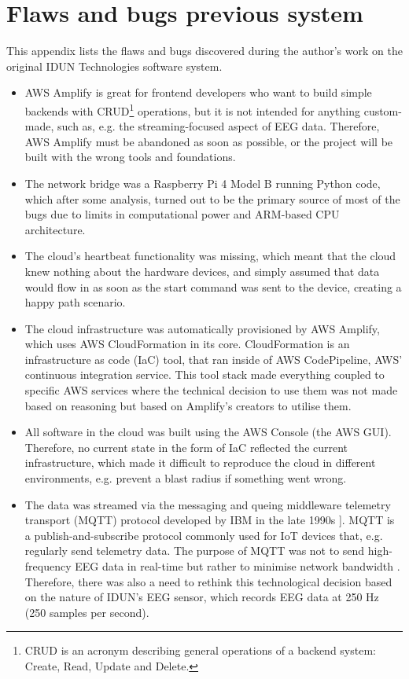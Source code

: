 \chapter{Flaws and bugs previous system}
\label{appendix2-flaws-and-bugs-previous-system}

This appendix lists the flaws and bugs discovered during the author's work on the original IDUN Technologies software system.

\begin{itemize}
  \item AWS Amplify is great for frontend developers who want to build simple backends with CRUD\footnote{CRUD is an acronym describing general operations of a backend system: Create, Read, Update and Delete.} operations, but it is not intended for anything custom-made, such as, e.g. the streaming-focused aspect of EEG data. Therefore, AWS Amplify must be abandoned as soon as possible, or the project will be built with the wrong tools and foundations.
  \item The network bridge was a Raspberry Pi 4 Model B running Python code, which after some analysis, turned out to be the primary source of most of the bugs due to limits in computational power and ARM-based CPU architecture.
  \item The cloud's heartbeat functionality was missing, which meant that the cloud knew nothing about the hardware devices, and simply assumed that data would flow in as soon as the start command was sent to the device, creating a happy path scenario.
  \item The cloud infrastructure was automatically provisioned by AWS Amplify, which uses AWS CloudFormation in its core. CloudFormation is an infrastructure as code (IaC) tool, that ran inside of AWS CodePipeline, AWS' continuous integration service. This tool stack made everything coupled to specific AWS services where the technical decision to use them was not made based on reasoning but based on Amplify's creators to utilise them.
  \item All software in the cloud was built using the AWS Console (the AWS GUI). Therefore, no current state in the form of IaC reflected the current infrastructure, which made it difficult to reproduce the cloud in different environments, e.g. prevent a blast radius if something went wrong.
  \item The data was streamed via the messaging and queing middleware telemetry transport (MQTT) protocol developed by IBM in the late 1990s ]\citep{yuan_getting_2017}. MQTT is a publish-and-subscribe protocol commonly used for IoT devices that, e.g. regularly send telemetry data. The purpose of MQTT was not to send high-frequency EEG data in real-time but rather to minimise network bandwidth \citep{mqtt_use_nodate}. Therefore, there was also a need to rethink this technological decision based on the nature of IDUN's EEG sensor, which records EEG data at 250 Hz (250 samples per second).

\end{itemize}
